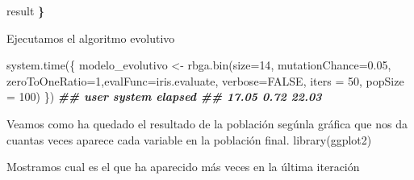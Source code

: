 \documentclass[
  a4paper,
  DIV=11,
  numbers=noendperiod]{scrreprt}
\newenvironment{Shaded}{\begin{snugshade}}{\end{snugshade}}
\newcommand{\AttributeTok}[1]{\textcolor[rgb]{0.77,0.63,0.00}{#1}}
\newcommand{\ConstantTok}[1]{\textcolor[rgb]{0.00,0.00,0.00}{#1}}
\newcommand{\DecValTok}[1]{\textcolor[rgb]{0.00,0.00,0.81}{#1}}
\newcommand{\DocumentationTok}[1]{\textcolor[rgb]{0.56,0.35,0.01}{\textbf{\textit{#1}}}}
\newcommand{\ErrorTok}[1]{\textcolor[rgb]{0.64,0.00,0.00}{\textbf{#1}}}
\newcommand{\FloatTok}[1]{\textcolor[rgb]{0.00,0.00,0.81}{#1}}
\newcommand{\FunctionTok}[1]{\textcolor[rgb]{0.00,0.00,0.00}{#1}}
\newcommand{\NormalTok}[1]{\textcolor[rgb]{0.00,0.00,0.00}{#1}}
\newcommand{\OtherTok}[1]{\textcolor[rgb]{0.56,0.35,0.01}{#1}}
\newcommand{\SpecialCharTok}[1]{\textcolor[rgb]{0.00,0.00,0.00}{#1}}
\begin{document}
\begin{Shaded}
\begin{Highlighting}[numbers=left,,]
\NormalTok{result }\ErrorTok{\}}
\end{Highlighting}
\end{Shaded}

\begin{Shaded}
\begin{Highlighting}[numbers=left,,]
\NormalTok{Ejecutamos el algoritmo evolutivo}
\end{Highlighting}
\end{Shaded}

\begin{Shaded}
\begin{Highlighting}[numbers=left,,]
\FunctionTok{system.time}\NormalTok{(\{ modelo\_evolutivo }\OtherTok{\textless{}{-}} \FunctionTok{rbga.bin}\NormalTok{(}\AttributeTok{size=}\DecValTok{14}\NormalTok{, }\AttributeTok{mutationChance=}\FloatTok{0.05}\NormalTok{, }\AttributeTok{zeroToOneRatio=}\DecValTok{1}\NormalTok{,}\AttributeTok{evalFunc=}\NormalTok{iris.evaluate, }\AttributeTok{verbose=}\ConstantTok{FALSE}\NormalTok{, }\AttributeTok{iters =} \DecValTok{50}\NormalTok{, }\AttributeTok{popSize =} \DecValTok{100}\NormalTok{) \}) }\DocumentationTok{\#\# user system elapsed \#\# 17.05 0.72 22.03}
\end{Highlighting}
\end{Shaded}

\begin{Shaded}
\begin{Highlighting}[numbers=left,,]
\NormalTok{Veamos como ha quedado el resultado de la población segúnla gráfica que nos da cuantas veces aparece cada variable en la población final. }\FunctionTok{library}\NormalTok{(ggplot2)}
\end{Highlighting}
\end{Shaded}

\begin{Shaded}
\begin{Highlighting}[numbers=left,,]
\NormalTok{Mostramos cual es el que ha aparecido más veces en la última iteración}
\end{Highlighting}
\end{Shaded}

\begin{Shaded}
\end{Shaded}
\end{document}
